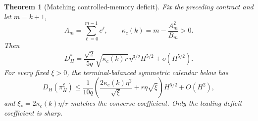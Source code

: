 \documentclass[11pt]{article}
\newtheorem{theorem}{Theorem}
\begin{document}
\begin{theorem}[Matching controlled-memory deficit]\label{thm:main}
Fix the preceding contract and let $m=k+1$,
\[
A_m=\sum_{\ell=0}^{m-1}c^\ell,\qquad
\kappa_c(k)=m-\frac{A_m^2}{B_m}>0.
\]
Then
\begin{equation}\label{eq:sharp}
D_H^*=\frac{\sqrt2}{5q}\sqrt{\kappa_c(k)r}\,\eta^{3/2}H^{5/2}
+o(H^{5/2}).
\end{equation}
For every fixed $\xi>0$, the terminal-balanced symmetric calendar below has
\begin{equation}\label{eq:upper}
D_H(\pi_H^\xi)\le\frac1{10q}
\left(\frac{2\kappa_c(k)\eta^2}{\sqrt\xi}+r\eta\sqrt\xi\right)H^{5/2}
+O(H^2),
\end{equation}
and $\xi_*=2\kappa_c(k)\eta/r$ matches the converse coefficient.
Only the leading deficit coefficient is sharp.
\end{theorem}
\end{document}
